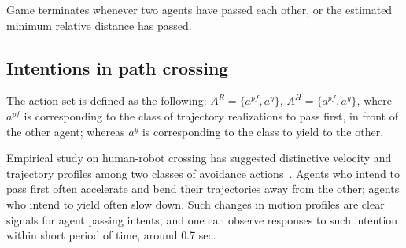 \documentclass[letterpaper, 10 pt, conference]{ieeeconf}  %
\begin{document}
Game terminates whenever two agents have passed each other, or the estimated 
minimum relative distance has passed.

\subsection{Intentions in path crossing}
The action set is defined as the following: $A^R = \{a^{pf}, a^y\}$, 
$A^H = \{a^{pf},a^y\}$, where $a^{pf}$ is corresponding to the class of 
trajectory realizations to pass first, in front of the other agent; whereas 
$a^y$ is corresponding to the class to yield to the other. 

Empirical study on human-robot crossing has suggested distinctive velocity and 
trajectory profiles among two classes of avoidance 
actions~\cite{paris2007pedestrian}. Agents who intend to pass first often 
accelerate and bend their trajectories away from the other; agents who intend 
to yield often slow down. Such changes in motion profiles are clear 
signals for agent passing intents, and one can observe responses to such 
intention within short period of time, around 0.7 sec.    






\end{document}
